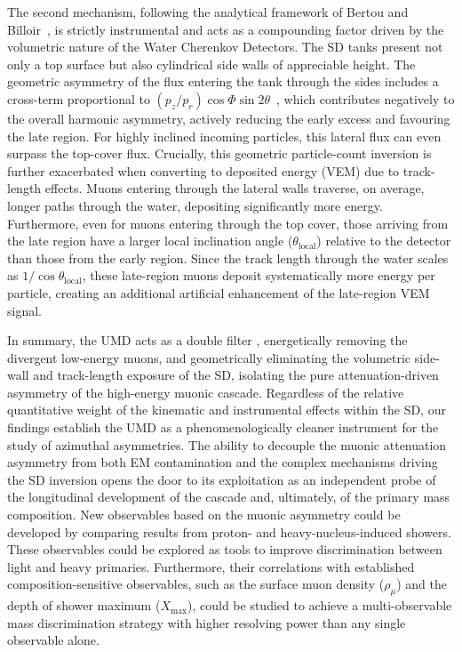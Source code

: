 \documentclass[11pt,a4paper]{article}
\begin{document}
The second mechanism, following the analytical framework of Bertou and Billoir~\cite{GAP2000_017}, is strictly instrumental and acts as a compounding factor driven by the volumetric nature of the Water Cherenkov Detectors. The SD tanks present not only a top surface but also cylindrical side walls of appreciable height. The geometric asymmetry of the flux entering the tank through the sides includes a cross-term proportional to $(p_z/p_r) \cos\Phi \sin 2\theta$~\cite{GAP2000_017}, which contributes negatively to the overall harmonic asymmetry, actively reducing the early excess and favouring the late region. For highly inclined incoming particles, this lateral flux can even surpass the top-cover flux. Crucially, this geometric particle-count inversion is further exacerbated when converting to deposited energy (VEM) due to track-length effects. Muons entering through the lateral walls traverse, on average, longer paths through the water, depositing significantly more energy. Furthermore, even for muons entering through the top cover, those arriving from the late region have a larger local inclination angle ($\theta_{\text{local}}$) relative to the detector than those from the early region. Since the track length through the water scales as $1/\cos\theta_{\text{local}}$, these late-region muons deposit systematically more energy per particle, creating an additional artificial enhancement of the late-region VEM signal.

In summary, the UMD acts as a double filter , energetically removing the divergent low-energy muons, and geometrically eliminating the volumetric side-wall and track-length exposure of the SD, isolating the pure attenuation-driven asymmetry of the high-energy muonic cascade. Regardless of the relative quantitative weight of the kinematic and instrumental effects within the SD, our findings establish the UMD as a phenomenologically cleaner instrument for the study of azimuthal asymmetries. The ability to decouple the muonic attenuation asymmetry from both EM contamination and the complex mechanisms driving the SD inversion opens the door to its exploitation as an independent probe of the longitudinal development of the cascade and, ultimately, of the primary mass composition. New observables based on the muonic asymmetry could be developed by comparing results from proton- and heavy-nucleus-induced showers. These observables could be explored as tools to improve discrimination between light and heavy primaries. Furthermore, their correlations with established composition-sensitive observables, such as the surface muon density ($\rho_\mu$) and the depth of shower maximum ($X_{\max}$), could be studied to achieve a multi-observable mass discrimination strategy with higher resolving power than any single observable alone. 
\end{document}
